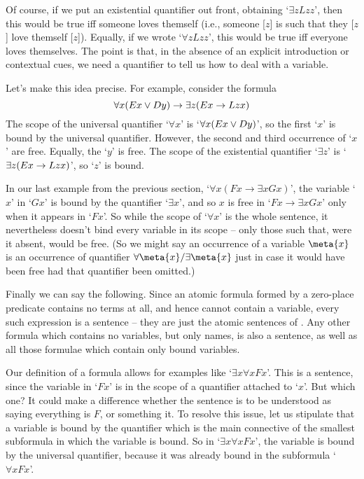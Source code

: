 Of course, if we put an existential quantifier out front, obtaining `$\exists zLzz$', then this would be true iff someone loves themself (i.e., someone [$z$] is such that they [$z$] love themself [$z$]). Equally, if we wrote `$\forall z Lzz$', this would be true iff everyone loves themselves. The point is that, in the absence of an explicit introduction or contextual cues, we need a quantifier to tell us how to deal with a variable. 

Let's make this idea precise.
For example, consider the formula
	$$\forall x(Ex \vee Dy) \rightarrow \exists z(Ex \rightarrow Lzx)$$
The scope of the universal quantifier `$\forall x$' is `$\forall x (Ex \vee Dy)$', so the first `$x$' is bound by the universal quantifier. However, the second and third occurrence of `$x$' are free. Equally, the `$y$' is free. The scope of the existential quantifier `$\exists z$' is `$\exists z(Ex \rightarrow Lzx)$', so `$z$' is bound. 

In our last example from the previous section, `$\forall x (Fx \to \exists xGx)$', the variable `$x$' in `$Gx$' is bound by the quantifier `$\exists x$', and so $x$ is free in `$Fx \to \exists x Gx$' only when it appears in `$Fx$'. So while the scope of `$\forall x$' is the whole sentence, it nevertheless doesn't bind every variable in its scope – only those such that, were it absent, would be free. (So we might say an occurrence of a variable $\meta{x}$ is  an occurrence of quantifier $\forall \meta{x}/\exists \meta{x}$ just in case it would have been free had that quantifier been omitted.) 


Finally we can say the following.	
Since an atomic formula formed by a zero-place predicate contains no terms at all, and hence cannot contain a variable, every such expression is a sentence – they are just the atomic sentences of \TFL. Any other formula which contains no variables, but only names, is also a sentence, as well as all those formulae which contain only bound variables. 

Our definition of a formula allows for examples like `$\exists x \forall x Fx$'. This is a sentence, since the variable in `$Fx$' is in the scope of a quantifier attached to `$x$'. But which one? It could make a difference whether the sentence is to be understood as saying everything is $F$, or something it. To resolve this issue, let us stipulate that a variable is bound by the quantifier which is the main connective of the smallest subformula in which the variable is bound. So in `$\exists x \forall x Fx$', the variable is bound by the universal quantifier, because it was already bound in the subformula `$\forall x Fx$'.


